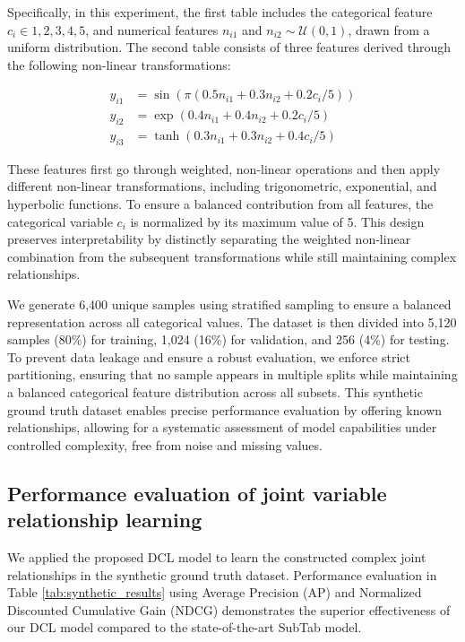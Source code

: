 \documentclass[]{nature_mod}
\begin{document}
Specifically, in this experiment, the first table includes the categorical feature $c_i \in {1,2,3,4,5}$, and numerical features $n_{i1}$ and $ n_{i2} \sim \mathcal{U}(0,1)$, drawn from a uniform distribution. The second table consists of three features derived through the following non-linear transformations:

\begin{equation}
\begin{aligned}
y_{i1} &= \sin(\pi(0.5n_{i1} + 0.3n_{i2} + 0.2c_i/5)) \\
y_{i2} &= \exp(0.4n_{i1} + 0.4n_{i2} + 0.2c_i/5) \\
y_{i3} &= \tanh(0.3n_{i1} + 0.3n_{i2} + 0.4c_i/5)
\end{aligned}
\end{equation}

These features first go through weighted, non-linear operations and then apply different non-linear transformations, including trigonometric, exponential, and hyperbolic functions. To ensure a balanced contribution from all features, the categorical variable $c_i$ is normalized by its maximum value of 5. This design preserves interpretability by distinctly separating the weighted non-linear combination from the subsequent transformations while still maintaining complex relationships.

We generate 6,400 unique samples using stratified sampling to ensure a balanced representation across all categorical values. The dataset is then divided into 5,120 samples (80\%) for training, 1,024 (16\%) for validation, and 256 (4\%) for testing. To prevent data leakage and ensure a robust evaluation, we enforce strict partitioning, ensuring that no sample appears in multiple splits while maintaining a balanced categorical feature distribution across all subsets. This synthetic ground truth dataset enables precise performance evaluation by offering known relationships, allowing for a systematic assessment of model capabilities under controlled complexity, free from noise and missing values.



\subsection{Performance evaluation of joint variable relationship learning}

We applied the proposed DCL model to learn the constructed complex joint relationships in the synthetic ground truth dataset. Performance evaluation in Table \ref{tab:synthetic_results} using Average Precision (AP) and Normalized Discounted Cumulative Gain (NDCG) demonstrates the superior effectiveness of our DCL model compared to the state-of-the-art SubTab model. 
\end{document}
